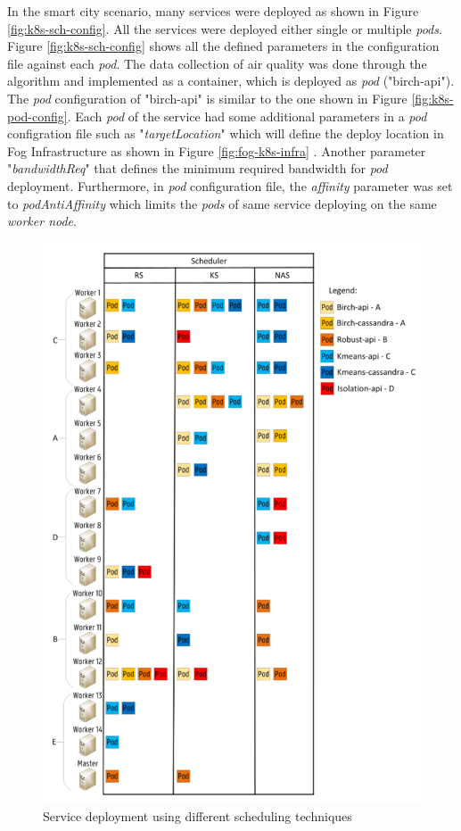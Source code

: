 In the smart city scenario, many services were deployed as shown in Figure \ref{fig:k8s-sch-config}. All the services were deployed either single or multiple \emph{pods}. Figure \ref{fig:k8s-sch-config} shows all the defined parameters in the configuration file against each \emph{pod}. The data collection of air quality was done through the algorithm and implemented as a container, which is deployed as \emph{pod} ("birch-api")\cite{Santos2019}. The \emph{pod} configuration of "birch-api" is similar to the one shown in Figure \ref{fig:k8s-pod-config}. Each \emph{pod} of the service  had some additional parameters in a \emph{pod} configration file such as "\emph{targetLocation}" which will define the deploy location in Fog Infrastructure as shown in Figure \ref{fig:fog-k8s-infra} \cite{Santos2019}. Another parameter "\emph{bandwidthReq}" that defines the minimum required bandwidth for \emph{pod} deployment\cite{Santos2019}. Furthermore, in \emph{pod} configuration file, the \emph{affinity} parameter was set to \emph{podAntiAffinity} which limits the \emph{pods} of same service deploying on the same \emph{worker node}\cite{Santos2019}.
\begin{figure}
  \centering
  \includegraphics[width=\linewidth]{figures/mlcn-k8s-service-prov.pdf}
  \caption{Service deployment using different scheduling techniques\cite{Santos2019}}
  \label{fig:k8s-service}
\end{figure}
